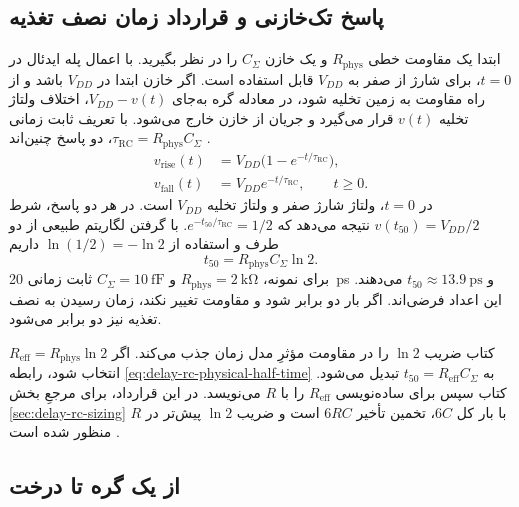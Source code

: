 \subsection{پاسخ تک‌خازنی و قرارداد زمان نصف تغذیه}
\label{sec:delay-rc-half-time}

ابتدا یک مقاومت خطی \(R_{\mathrm{phys}}\) و یک خازن \(C_\Sigma\)
را در نظر بگیرید. با اعمال پله ایدئال در \(t=0\)،
برای شارژ از صفر به \(V_{DD}\) قابل استفاده است. اگر خازن ابتدا
در \(V_{DD}\) باشد و از راه مقاومت به زمین تخلیه شود، در معادله
گره به‌جای \(V_{DD}-v(t)\)، اختلاف ولتاژ تخلیه \(v(t)\) قرار
می‌گیرد و جریان از خازن خارج می‌شود. با تعریف ثابت زمانی
\(\tau_{\mathrm{RC}}=R_{\mathrm{phys}}C_\Sigma\)، دو پاسخ چنین‌اند
\cite[بخش ، صفحات ۱۴۸ و ۱۴۹]{weste}.
\begin{equation}
  \begin{aligned}
    v_{\mathrm{rise}}(t)&=V_{DD}\bigl(1-e^{-t/\tau_{\mathrm{RC}}}\bigr),\\
    v_{\mathrm{fall}}(t)&=V_{DD}e^{-t/\tau_{\mathrm{RC}}},
      \qquad t\ge 0.
  \end{aligned}
  \label{eq:delay-rc-step}
\end{equation}
در \(t=0\)، ولتاژ شارژ صفر و ولتاژ تخلیه \(V_{DD}\) است.
در هر دو پاسخ، شرط \(v(t_{50})=V_{DD}/2\) نتیجه می‌دهد که
\(e^{-t_{50}/\tau_{\mathrm{RC}}}=1/2\). با گرفتن لگاریتم طبیعی
از دو طرف و استفاده از \(\ln(1/2)=-\ln 2\) داریم
\begin{equation}
  t_{50}=R_{\mathrm{phys}}C_\Sigma\ln 2.
  \label{eq:delay-rc-physical-half-time}
\end{equation}
برای نمونه، \(R_{\mathrm{phys}}=\qty{2}{\kilo\ohm}\) و
\(C_\Sigma=\qty{10}{\femto\farad}\) ثابت زمانی
\qty{20}{\pico\second} و \(t_{50}\approx\qty{13.9}{\pico\second}\)
می‌دهند. این اعداد فرضی‌اند. اگر بار دو برابر شود و مقاومت تغییر
نکند، زمان رسیدن به نصف تغذیه نیز دو برابر می‌شود.

کتاب ضریب \(\ln 2\) را در مقاومت مؤثرِ مدل زمان جذب می‌کند.
اگر \(R_{\mathrm{eff}}=R_{\mathrm{phys}}\ln 2\) انتخاب شود،
رابطه \eqref{eq:delay-rc-physical-half-time} به
\(t_{50}=R_{\mathrm{eff}}C_\Sigma\) تبدیل می‌شود. کتاب سپس
برای ساده‌نویسی \(R_{\mathrm{eff}}\) را با \(R\) می‌نویسد.
در این قرارداد، برای  مرجعِ بخش
\ref{sec:delay-rc-sizing} با بار کل \(6C\)، تخمین تأخیر
\(6RC\) است و ضریب \(\ln 2\) پیش‌تر در \(R\) منظور شده
است \cite[رابطه  و شکل ، صفحات
۱۴۷ و ۱۴۹]{weste}.

\subsection{از یک گره تا درخت }
\label{sec:delay-elmore}

